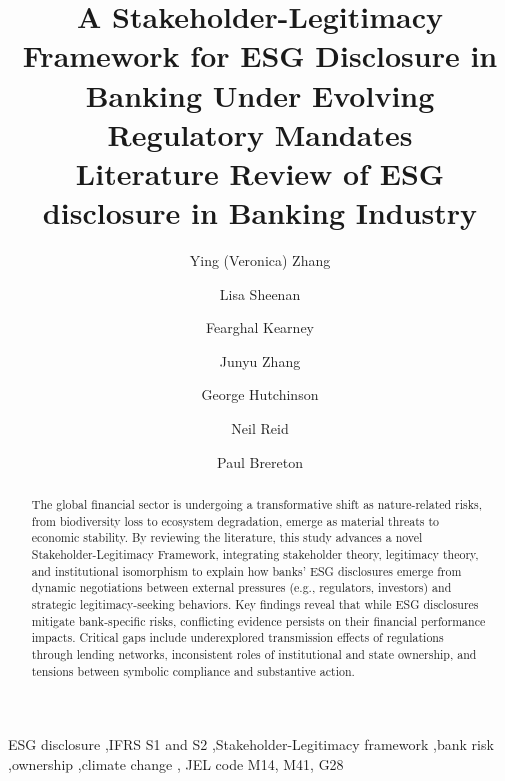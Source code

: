 \documentclass[
  authoryear]{elsarticle}
\begin{document}
\begin{frontmatter}
\title{A Stakeholder-Legitimacy Framework for ESG Disclosure in Banking
Under Evolving Regulatory Mandates \\\large{Literature Review of ESG
disclosure in Banking Industry} }

\author[1]{Ying (Veronica) Zhang%
%
}
\author[2]{Lisa Sheenan%
%
}
\author[3]{Fearghal Kearney%
%
}
\author[1]{Junyu Zhang%
%
}

\author[1]{George Hutchinson%
%
}

\author[1]{Neil Reid%
%
}

\author[1]{Paul Brereton%
%
}








        
\begin{abstract}
The global financial sector is undergoing a transformative shift as
nature-related risks, from biodiversity loss to ecosystem degradation,
emerge as material threats to economic stability. By reviewing the
literature, this study advances a novel Stakeholder-Legitimacy
Framework, integrating stakeholder theory, legitimacy theory, and
institutional isomorphism to explain how banks' ESG disclosures emerge
from dynamic negotiations between external pressures (e.g., regulators,
investors) and strategic legitimacy-seeking behaviors. Key findings
reveal that while ESG disclosures mitigate bank-specific risks,
conflicting evidence persists on their financial performance impacts.
Critical gaps include underexplored transmission effects of regulations
through lending networks, inconsistent roles of institutional and state
ownership, and tensions between symbolic compliance and substantive
action.
\end{abstract}





\begin{keyword}
    ESG disclosure \sep IFRS S1 and S2 \sep Stakeholder-Legitimacy
framework \sep bank risk \sep ownership \sep climate change \sep 
    JEL code M14, M41, G28
\end{keyword}
\end{frontmatter}
    
\end{document}
